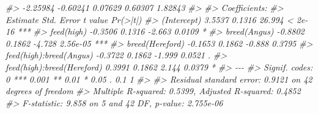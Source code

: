 \documentclass[
]{article}
\newenvironment{Shaded}{\begin{snugshade}}{\end{snugshade}}
\newcommand{\CommentTok}[1]{\textcolor[rgb]{0.56,0.35,0.01}{\textit{#1}}}
\begin{document}
\begin{Shaded}
\begin{Highlighting}[]
\CommentTok{\#\textgreater{} {-}2.25984 {-}0.60241  0.07629  0.60307  1.82843 }
\CommentTok{\#\textgreater{} }
\CommentTok{\#\textgreater{} Coefficients:}
\CommentTok{\#\textgreater{}                            Estimate Std. Error t value Pr(\textgreater{}|t|)    }
\CommentTok{\#\textgreater{} (Intercept)                  3.5537     0.1316  26.994  \textless{} 2e{-}16 ***}
\CommentTok{\#\textgreater{} feed(high)                  {-}0.3506     0.1316  {-}2.663   0.0109 *  }
\CommentTok{\#\textgreater{} breed(Angus)                {-}0.8802     0.1862  {-}4.728 2.56e{-}05 ***}
\CommentTok{\#\textgreater{} breed(Hereford)             {-}0.1653     0.1862  {-}0.888   0.3795    }
\CommentTok{\#\textgreater{} feed(high):breed(Angus)     {-}0.3722     0.1862  {-}1.999   0.0521 .  }
\CommentTok{\#\textgreater{} feed(high):breed(Hereford)   0.3991     0.1862   2.144   0.0379 *  }
\CommentTok{\#\textgreater{} {-}{-}{-}}
\CommentTok{\#\textgreater{} Signif. codes:  0 \textquotesingle{}***\textquotesingle{} 0.001 \textquotesingle{}**\textquotesingle{} 0.01 \textquotesingle{}*\textquotesingle{} 0.05 \textquotesingle{}.\textquotesingle{} 0.1 \textquotesingle{} \textquotesingle{} 1}
\CommentTok{\#\textgreater{} }
\CommentTok{\#\textgreater{} Residual standard error: 0.9121 on 42 degrees of freedom}
\CommentTok{\#\textgreater{} Multiple R{-}squared:  0.5399, Adjusted R{-}squared:  0.4852 }
\CommentTok{\#\textgreater{} F{-}statistic: 9.858 on 5 and 42 DF,  p{-}value: 2.755e{-}06}
\end{Highlighting}
\end{Shaded}
\end{document}

